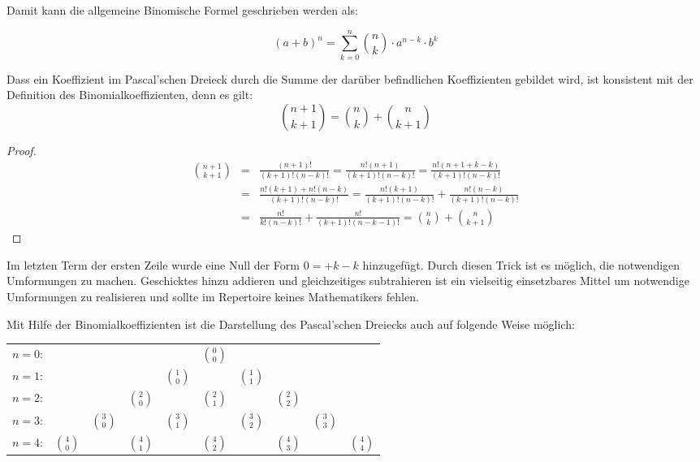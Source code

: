 \noindent Damit kann die allgemeine Binomische Formel geschrieben werden als:

\begin{equation}
(a+b)^n = \sum_{k=0}^{n} \binom{n}{k} \cdot a^{n-k}\cdot b^k
\end{equation}

\begin{lemma}
Dass ein Koeffizient im Pascal'schen Dreieck durch die Summe der darüber befindlichen Koeffizienten gebildet wird, ist konsistent mit der Definition des Binomialkoeffizienten, denn es gilt:
\[
\binom{n+1}{k+1} = \binom{n}{k} + \binom{n}{k+1}
\]
\end{lemma}

\begin{proof}
\begin{eqnarray*}
\binom{n+1}{k+1} &=& \frac{(n+1)!}{(k+1)!(n-k)!} = \frac{n!(n+1)}{(k+1)!(n-k)!} = \frac{n!(n+1+k-k)}{(k+1)!(n-k)!} \\
&=& \frac{n!(k+1) +n!(n-k)}{(k+1)!(n-k)!} = \frac{n!(k+1)}{(k+1)!(n-k)!}+\frac{n!(n-k)}{(k+1)!(n-k)!} \\
&=& \frac{n!}{k!(n-k)!} + \frac{n!}{(k+1)!(n-k-1)!} = \binom{n}{k}+\binom{n}{k+1}
\end{eqnarray*}
\end{proof}

\HandRight \qquad Im letzten Term der ersten Zeile wurde eine Null der Form $0=+k-k$ hinzugefügt. Durch diesen Trick ist es möglich, die notwendigen Umformungen zu machen. Geschicktes hinzu addieren und gleichzeitiges subtrahieren ist ein vielseitig einsetzbares Mittel um notwendige Umformungen zu realisieren und sollte im Repertoire keines Mathematikers fehlen. 

\bigskip

Mit Hilfe der Binomialkoeffizienten ist die Darstellung des Pascal'schen Dreiecks auch auf folgende Weise möglich:

\begin{center}
\begin{tabular}{rccccccccc} 
$n=0$:& & & & & $\binom{0}{0}$\\
\noalign{\smallskip} $n=1$:& & & & $\binom{1}{0}$ & & $\binom{1}{1}$\\
\noalign{\smallskip} $n=2$:& & & $\binom{2}{0}$ & & $\binom{2}{1}$ & & $\binom{2}{2}$\\
\noalign{\smallskip} $n=3$:& & $\binom{3}{0}$ & & $\binom{3}{1}$ & & $\binom{3}{2}$ & & $\binom{3}{3}$\\
\noalign{\smallskip} $n=4$:& $\binom{4}{0}$ & & $\binom{4}{1}$ & & $\binom{4}{2}$ & & $\binom{4}{3}$ & & $\binom{4}{4}$
\end{tabular}
\end{center}


